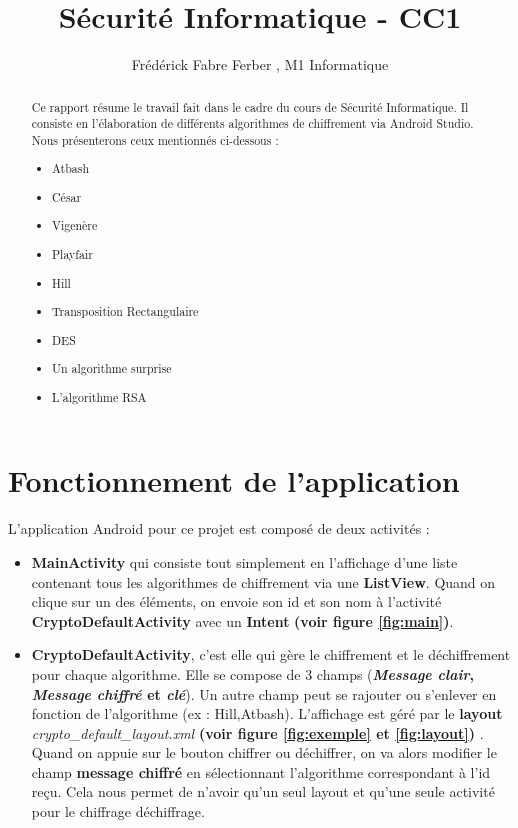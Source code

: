 \documentclass{article}
\title{Sécurité Informatique - CC1}
\author{Fr\'ed\'erick Fabre Ferber , M1 Informatique}
\begin{document}
\maketitle


\begin{abstract}
Ce rapport résume le travail fait dans le cadre du cours de Sécurité Informatique. Il consiste en l'élaboration de différents algorithmes de chiffrement via Android Studio.
Nous présenterons ceux mentionnés ci-dessous :
\begin{itemize}
\item Atbash
\item César
\item Vigenère
\item Playfair
\item Hill
\item Transposition Rectangulaire
\item DES
\item Un algorithme surprise
\item L'algorithme RSA 
\end{itemize}
\end{abstract}


\section{Fonctionnement de l'application}

L'application Android pour ce projet est composé de deux activités : 
\begin{itemize}
\item \textbf{MainActivity} qui consiste tout simplement en l'affichage d'une liste contenant tous les algorithmes de chiffrement via une \textbf{ListView}. Quand on clique sur un des éléments, on envoie son id et son nom à l'activité \textbf{CryptoDefaultActivity} avec un \textbf{Intent} \textbf{(voir figure  \ref{fig:main})}.
\vspace{1\baselineskip}

\item \textbf{CryptoDefaultActivity}, c'est elle qui gère le chiffrement et le déchiffrement pour chaque algorithme. Elle se compose de 3 champs (\textbf{\textit{Message clair}, \textit{Message chiffré} et \textit{clé}}). 
Un autre champ peut se rajouter ou s'enlever en fonction de l'algorithme (ex : Hill,Atbash). L'affichage est géré par le \textbf{layout} \textit{crypto\_default\_layout.xml} \textbf{(voir figure \ref{fig:exemple} et \ref{fig:layout})} .
Quand on appuie sur le bouton chiffrer ou déchiffrer, on va alors modifier le champ \textbf{message chiffré} en sélectionnant l'algorithme correspondant à l'id reçu. Cela nous permet de n'avoir qu'un seul layout et qu'une seule activité pour le chiffrage déchiffrage.

\end{itemize}
\vspace{1\baselineskip}
\end{document}
